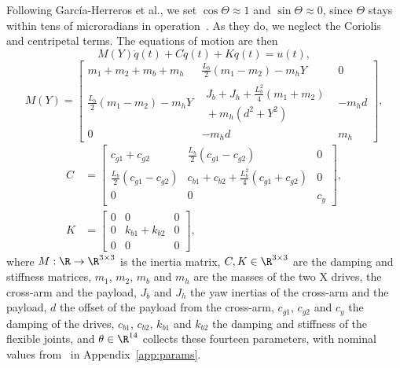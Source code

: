 Following Garc\'ia-Herreros et al., we set $\cos\Theta\approx1$ and
$\sin\Theta\approx0$, since $\Theta$ stays within tens of microradians in
operation~\cite[Sec.~2.3]{garcia2013model}.
As they do, we neglect the Coriolis and centripetal terms.
The equations of motion are then
\begin{equation}
  M(Y)\ddot{q}(t) + C\dot{q}(t) + K q(t) = u(t),
  \label{eq:eom}
\end{equation}
{\footnotesize
\setlength{\arraycolsep}{3pt}
\begin{equation}
M(Y)=
\begin{bmatrix}
m_1+m_2+m_b+m_h & \tfrac{L_b}{2}(m_1-m_2)-m_hY & 0\\
\tfrac{L_b}{2}(m_1-m_2)-m_hY &
\substack{J_b+J_h+\tfrac{L_b^2}{4}(m_1+m_2)\\{}+m_h(d^2+Y^2)} & -m_hd\\
0 & -m_hd & m_h
\end{bmatrix},
\label{eq:mass_matrix}
\end{equation}
\begin{equation}
\begin{aligned}
C&=
\begin{bmatrix}
c_{g1}+c_{g2} & \tfrac{L_b}{2}(c_{g1}-c_{g2}) & 0\\
\tfrac{L_b}{2}(c_{g1}-c_{g2}) &
c_{b1}+c_{b2}+\tfrac{L_b^2}{4}(c_{g1}+c_{g2}) & 0\\
0 & 0 & c_y
\end{bmatrix},\\[1ex]
K&=
\begin{bmatrix}
0&0&0\\
0&k_{b1}+k_{b2}&0\\
0&0&0
\end{bmatrix},
\end{aligned}
\label{eq:damping_stiffness_matrices}
\end{equation}
}
where $M:\R\to\R^{3\times3}$ is the inertia matrix, $C,K\in\R^{3\times3}$
are the damping and stiffness matrices, $m_1$, $m_2$, $m_b$ and $m_h$ are the
masses of the two X drives, the cross-arm and the payload, $J_b$ and $J_h$ the
yaw inertias of the cross-arm and the payload, $d$ the offset of the payload
from the cross-arm, $c_{g1}$, $c_{g2}$ and $c_y$ the damping of the drives,
$c_{b1}$, $c_{b2}$, $k_{b1}$ and $k_{b2}$ the damping and stiffness of the
flexible joints, and $\theta\in\R^{14}$ collects these fourteen parameters,
with nominal values from~\cite[Table~I]{garcia2013model} in
Appendix~\ref{app:params}.

